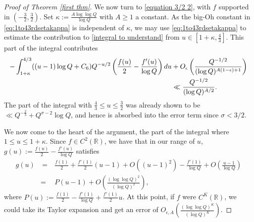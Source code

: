 \documentclass[12pt,reqno]{amsart}
\numberwithin{equation}{section}
\theoremstyle{plain}
\begin{document}
\begin{proof}[Proof of Theorem \ref{first thm}] We now turn to \eqref{equation 3/2 2}, with $f$ supported in $(-\frac 32, \frac 32)$.
Set $\kappa:=\frac{A\log\log Q}{\log Q}$ with $A\geq 1$ a constant. As the big-Oh constant in \eqref{eq:1to43rdsetakappa} is independent of $\kappa$, we may use \eqref{eq:1to43rdsetakappa} to estimate the contribution to \eqref{integral to understand} from $u \in [1+\kappa, \frac 43]$.  This part of the integral contributes \begin{align} -\int_{1+\kappa}^{4/3 }(  (u-1)\log Q+C_6  ) Q^{-u/2} \left(\frac {f(u)}2 -\frac {f'(u)}{\log Q}\right) du &+ O_{\epsilon}\left(\frac {Q^{-1/2}}{(\log Q)^{A(1-\epsilon)+1}}\right)\notag \\
&\ll \frac {Q^{-1/2}}{(\log Q)^{A/2}}.
\label{part of the integral bigger than 1+kappa}
\end{align}
The part of the integral with $\frac 43 \leq u \leq \frac 32$ was already shown to be $\ll Q^{-\frac 23}+Q^{\sigma-2}\log Q$, and hence is absorbed into the error term since $\sigma< 3/2$.

We now come to the heart of the argument, the part of the integral where $1\leq u \leq 1+\kappa$. Since $f\in C^2(\mathbb R)$, we have that in our range of $u$, $g(u):= \frac {f(u)}2 -\frac {f'(u)}{\log Q}$ satisfies
\begin{eqnarray} g(u) & \ =\ & \frac {f(1)}2 +\frac {f'(1)}2 (u-1) + O((u-1)^2) - \frac {f'(1)}{\log Q} + O\left(\frac{u-1}{\log Q}\right) \nonumber\\
&=& P(u-1) +O\left( \frac {(\log \log Q)^2}{(\log Q)^2} \right),
\end{eqnarray}
where $P(u) := \frac {f(1)}2- \frac {f'(1)}{\log Q} +\frac {f'(1)}2 u$.
At this point, if $f$ were $C^{K}(\mathbb R)$, we could take its Taylor expansion and get an error of $O_{\epsilon,A}\left( \frac {(\log \log Q)^{K}}{(\log Q)^{K}}\right)$.


\end{proof}
\end{document}
